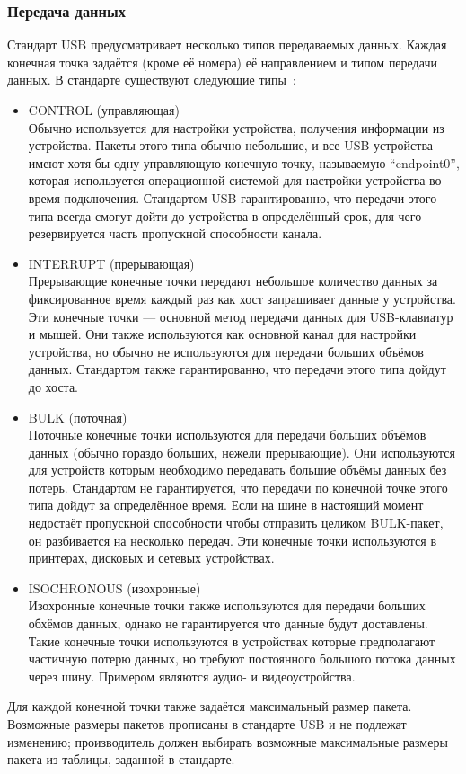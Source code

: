 \documentclass[a4paper,12pt]{report}
\numberwithin{equation}{section}
\begin{document}
\subsubsection{Передача данных}
Стандарт USB предусматривает несколько типов передаваемых данных. Каждая
конечная точка задаётся (кроме её номера) её направлением и типом передачи
данных. В стандарте существуют следующие типы~\cite{corbet2009linux}:
\begin{itemize}
\item CONTROL (управляющая) \\
Обычно используется для настройки устройства, получения информации из
устройства. Пакеты этого типа обычно небольшие, и все USB-устройства имеют хотя
бы одну управляющую конечную точку, называемую ``endpoint0'', которая
используется операционной системой для настройки устройства во время
подключения. Стандартом USB гарантированно, что передачи этого типа всегда
смогут дойти до устройства в определённый срок, для чего резервируется часть
пропускной способности канала.
\item INTERRUPT (прерывающая) \\
Прерывающие конечные точки передают небольшое количество данных за фиксированное
время каждый раз как хост запрашивает данные у устройства. Эти конечные точки
--- основной метод передачи данных для USB-клавиатур и мышей. Они также
используются как основной канал для настройки устройства, но обычно не
используются для передачи больших объёмов данных. Стандартом также
гарантированно, что передачи этого типа дойдут до хоста.
\item BULK (поточная) \\
Поточные конечные точки используются для передачи больших объёмов данных
(обычно гораздо больших, нежели прерывающие). Они используются для устройств
которым необходимо передавать большие объёмы данных без потерь. Стандартом не
гарантируется, что передачи по конечной точке этого типа дойдут за определённое
время. Если на шине в настоящий момент недостаёт пропускной способности чтобы
отправить целиком BULK-пакет, он разбивается на несколько передач. Эти конечные
точки используются в принтерах, дисковых и сетевых устройствах.
\item ISOCHRONOUS (изохронные) \\
Изохронные конечные точки также используются для передачи больших обхёмов
данных, однако не гарантируется что данные будут доставлены. Такие конечные
точки используются в устройствах которые предполагают частичную потерю данных,
но требуют постоянного большого потока данных через шину. Примером являются
аудио- и видеоустройства.
\end{itemize}
Для каждой конечной точки также задаётся максимальный размер пакета. Возможные
размеры пакетов прописаны в стандарте USB и не подлежат изменению; производитель
должен выбирать возможные максимальные размеры пакета из таблицы, заданной в
стандарте.~\cite{wiki:usb}
\end{document}
